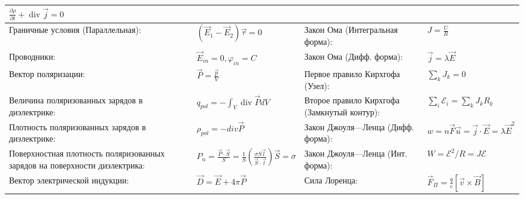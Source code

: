 \documentclass{article}
\begin{document}
\begin{tabular}{ |p{6cm}|p{3.5cm}|p{6cm}|p{3.5cm}|  }
$\frac{\partial \rho}{\partial t}+\operatorname{div} \vec{j}=0$            \\
\hline
Граничные условия (Параллельная):                                          &
$\left(\vec {E}_{1}-\vec{E}_{2}\right) \vec\tau=0$                         &
Закон Ома (Интегральная форма):                                            &
$J=\frac{U}{R}$                                                            \\
\hline
Проводники:                                                                &
$\vec E_{in} = 0, {\varphi}_{in} = C$                                      &
Закон Ома (Дифф. форма):                                                   &
$\vec{j}=\lambda \vec{E}$                                                  \\
\hline
Вектор поляризации:                                                        &
$\vec{P}=\frac{\vec{p}}{V}$                                                &
Первое правило Кирхгофа (Узел):                                            &
$\sum_{k} J_{k}=0$                                                         \\
\hline
Величина поляризованных зарядов в диэлектрике:                             &
$q_{pol}=-\int_{V} \operatorname{div} \vec{P} d V$                         &
Второе правило Кирхгофа (Замкнутый контур):                                &
$\sum_{i} \mathcal{E}_{i}=\sum_{k} J_{k} R_{k}$                            \\
\hline
Плотность поляризованных зарядов в диэлектрике:                            &
${\rho}_{pol}=-{div} \vec{P}$                                              &
Закон Джоуля—Ленца (Дифф. форма):                                          & 
$w=n \vec{F} \vec{u}=\vec{j} \cdot \vec{E} = \lambda \vec{E}^{2}$          \\
\hline
Поверхностная плотность поляризованных зарядов на поверхности диэлектрика: &
$P_{n}=\frac{\vec{P} \cdot \vec{S}}{S} = \frac{1}{S}\left(\frac{\sigma S \vec{l}}{\vec{S} \cdot \vec{l}}\right) \vec{S}=\sigma$ &
Закон Джоуля—Ленца (Инт. форма):                                           &
$W=\mathcal{E}^{2} / R=J \mathcal{E}$                                      \\
\hline
Вектор электрической индукции:                                             &
$\vec{D}=\vec{E}+4 \pi \vec{P}$                                            &
Сила Лоренца:                                                              &
$\vec{F}_{\Pi}=\frac{q}{c} [\vec{v} \times \vec{B}]$                       \\

\end{tabular}
\end{document}
